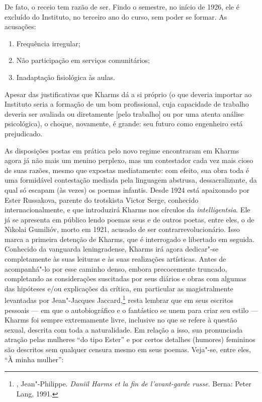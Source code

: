 De fato, o receio tem razão de ser. Findo o semestre, no início
de 1926, ele é excluído do Instituto, no terceiro ano do curso,
sem poder se formar. As acusações:

\begin{enumerate}
\item{}Frequência irregular;
\item{}Não participação em serviços comunitários;
\item{}Inadaptação fisiológica às aulas.
\end{enumerate}

Apesar das justificativas que Kharms dá a si próprio (o que
deveria importar ao Instituto seria a formação de um bom
profissional, cuja capacidade de trabalho deveria ser avaliada
ou diretamente [pelo trabalho] ou por uma atenta análise
psicológica), o choque, novamente, é grande: seu futuro como
engenheiro está prejudicado.

As disposições postas em prática pelo novo regime encontraram em
Kharms agora já não mais um menino perplexo, mas um contestador
cada vez mais cioso de suas razões, mesmo que expostas mediatamente:
com efeito, sua obra toda é uma formidável contestação mediada pela
linguagem abstrusa, dessacralizante, da qual só escapam (às vezes)
os poemas infantis. Desde 1924 está apaixonado por Ester Russakova,
parente do trotskista Victor Serge, conhecido internacionalmente,
e que introduzirá Kharms nos círculos da \emph{intelligentsia}.
Ele já se apresenta em público lendo poemas seus e de outros
poetas, entre eles, o de Nikolai Gumilióv, morto em 1921, acusado
de ser contrarrevolucionário. Isso marca a primeira detenção de
Kharms, que é interrogado e libertado em seguida. Conhecido da
vanguarda leningradense, Kharms irá agora dedicar"-se completamente
às suas leituras e às suas realizações artísticas. Antes de
acompanhá"-lo por esse caminho denso, embora precocemente
truncado, completando as considerações suscitadas por seus
diários e obras com algumas das hipóteses e/ou explicações
da crítica, em particular as magistralmente levantadas por
Jean"-Jacques Jaccard,\footnote{, Jean"-Philippe.
\emph{Daniil Harms et la fin de l'avant-garde russe}. Berna: Peter
Lang, 1991.} resta lembrar que em seus escritos pessoais ---
em que o autobiográfico e o fantástico se unem para criar seu
estilo --- Kharms foi sempre extremamente livre, inclusive no
que se refere à questão sexual, descrita com toda a naturalidade.
Em relação a isso, sua pronunciada atração pelas mulheres ``do
tipo Ester'' e por certos detalhes (humores) femininos são descritos
sem qualquer censura mesmo em seus poemas. Veja"-se, entre eles,
``À minha mulher'':

